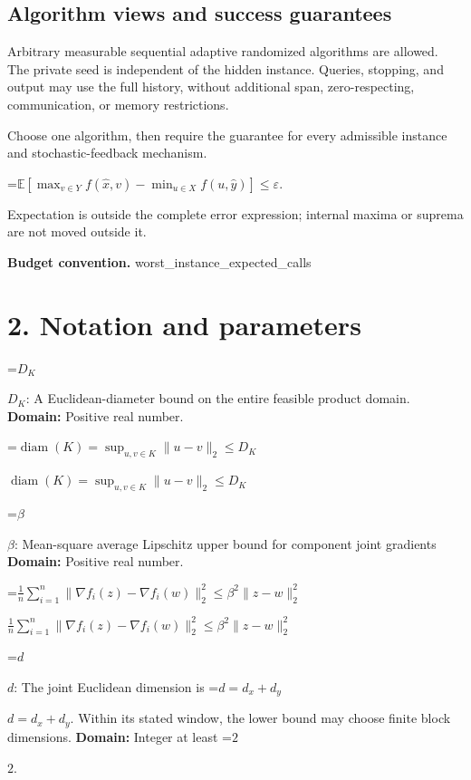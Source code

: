 \documentclass[10pt,a4paper]{article}
\newcommand{\AtlasMath}[1]{\par\begingroup\centering\setbox0=\hbox{$\displaystyle #1$}\ifdim\wd0>1.4\linewidth\typeout{ATLAS WIDE FORMULA: \the\wd0}\fi\ifdim\wd0>\linewidth\resizebox{\linewidth}{!}{\box0}\else\box0\fi\par\endgroup}
\newcommand{\AtlasInlineMath}[1]{\begingroup\setbox0=\hbox{$#1$}\ifdim\wd0>.4\linewidth\endgroup\AtlasMath{#1}\else\endgroup$#1$\fi}
\begin{document}
\subsection{Algorithm views and success guarantees}


Arbitrary measurable sequential adaptive randomized algorithms are allowed. The private seed is independent of the hidden instance. Queries, stopping, and output may use the full history, without additional span, zero-respecting, communication, or memory restrictions.



Choose one algorithm, then require the guarantee for every admissible instance and stochastic-feedback mechanism.




\AtlasMath{\mathbb{E}\!\left[\max_{v\in Y}f(\widehat{x},v)-\min_{u\in X}f(u,\widehat{y})\right]\le\varepsilon.}




Expectation is outside the complete error expression; internal maxima or suprema are not moved outside it.



\textbf{Budget convention.} worst\_instance\_expected\_calls



\section{2. Notation and parameters}


\AtlasInlineMath{D_K}: A Euclidean-diameter bound on the entire feasible product domain. \textbf{Domain:} Positive real number.



\AtlasInlineMath{\operatorname{diam}(K)=\sup_{u,v\in K}\|u-v\|_2\le D_K}



\AtlasInlineMath{\beta}: Mean-square average Lipschitz upper bound for component joint gradients \textbf{Domain:} Positive real number.



\AtlasInlineMath{\frac1n\sum_{i=1}^n\|\nabla f_i(z)-\nabla f_i(w)\|_2^2\le\beta^2\|z-w\|_2^2}



\AtlasInlineMath{d}: The joint Euclidean dimension is \AtlasInlineMath{d=d_x+d_y}. Within its stated window, the lower bound may choose finite block dimensions. \textbf{Domain:} Integer at least \AtlasInlineMath{2}.
\end{document}
